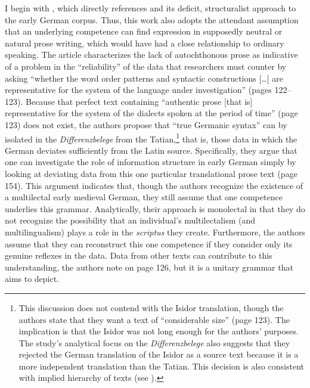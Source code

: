I begin with \citet{PetrovaSolf2009}, which directly references \citet{Fleischer2006} and its deficit, structuralist approach to the early German corpus. Thus, this work also adopts the attendant assumption that an underlying competence can find expression in supposedly neutral or natural prose writing, which would have had a close relationship to ordinary speaking. The article characterizes the lack of autochthonous prose as indicative of a problem in the “reliability” of the data that researchers must counter by asking “whether the word order patterns and syntactic constructions […] are representative for the system of the language under investigation” (pages 122--123). Because that perfect text containing “authentic prose [that is] representative for the system of the dialects spoken at the period of time” (page 123) does not exist, the authors propose that “true Germanic syntax” can by isolated in the \textit{Differenzbelege} from the Tatian,\footnote{{This discussion does not contend with the Isidor translation, though the authors state that they want a text of “considerable size” (page 123). The implication is that the Isidor was not long enough for the authors’ purposes. The study’s analytical focus on the} {\textit{Differenzbelege}} {also suggests that they rejected the German translation of the Isidor as a source text because it is a more independent translation than the Tatian. This decision is also consistent with  implied hierarchy of texts (see ).} } that is, those data in which the German deviates sufficiently from the Latin source. Specifically, they argue that one can investigate the role of information structure in early German simply by looking at deviating data from this one particular translational prose text (page 154). This argument indicates that, though the authors recognize the existence of a multilectal early medieval German, they still assume that one competence underlies this grammar. Analytically, their approach is monolectal in that they do not recognize the possibility that an individual’s multilectalism (and multilingualism) plays a role in the \textit{scriptus} they create. Furthermore, the authors assume that they can reconstruct this one competence if they consider only its genuine reflexes in the data. Data from other texts can contribute to this understanding, the authors note on page 126, but it is a unitary grammar that \citet{PetrovaSolf2009} aims to depict.\largerpage

